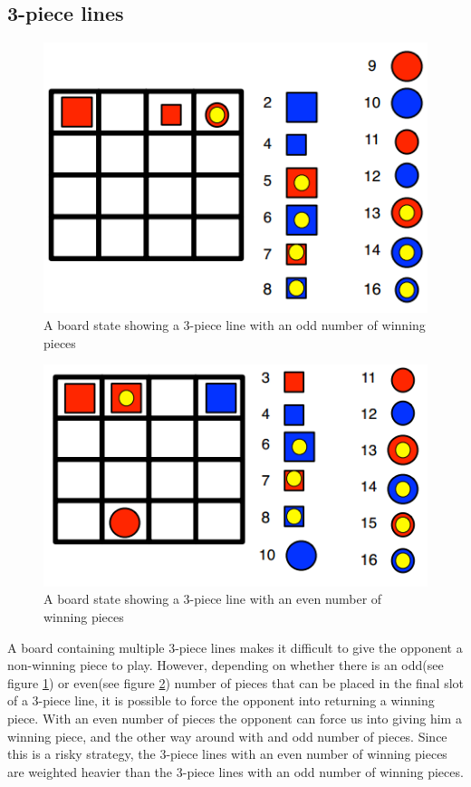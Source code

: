 \subsection{3-piece lines}
\begin{figure}[htb]
\includegraphics{pictures/3-odd.png}
\caption[A 3-piece line in \quarto{}]{A board state showing a 3-piece line with 
an odd number of winning pieces}
\label{fig:3-odd}
\end{figure}

\begin{figure}[htb]
\includegraphics{pictures/3-even.png}
\caption[A 3-piece line in \quarto{}]{A board state showing a 3-piece line with 
an even number of winning pieces}
\label{fig:3-even}
\end{figure}
A board containing multiple 3-piece lines makes it difficult to give the 
opponent a non-winning piece to play. However, depending on whether there is 
an odd(see figure \ref{fig:3-odd}) or even(see figure \ref{fig:3-even}) 
number of pieces that can be placed in the final slot of a 
3-piece line, it is possible to force the opponent into returning a winning 
piece. With an even number of pieces the opponent can force us into giving
him a winning piece, and the other way around with and odd number of pieces. 
Since this is a risky strategy, the 3-piece lines with an even number 
of winning pieces are weighted heavier than the 3-piece lines with an odd 
number of winning pieces.

